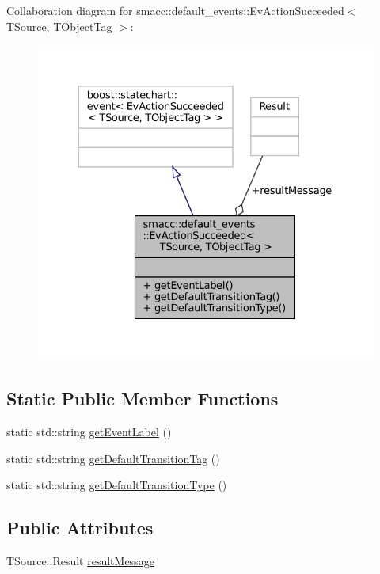 Collaboration diagram for smacc\+:\+:default\+\_\+events\+:\+:Ev\+Action\+Succeeded$<$ T\+Source, T\+Object\+Tag $>$\+:
\nopagebreak
\begin{figure}[H]
\begin{center}
\leavevmode
\includegraphics[width=329pt]{structsmacc_1_1default__events_1_1EvActionSucceeded__coll__graph}
\end{center}
\end{figure}
\subsection*{Static Public Member Functions}
\begin{DoxyCompactItemize}
\item 
static std\+::string \hyperlink{structsmacc_1_1default__events_1_1EvActionSucceeded_a8d002ec0ef39a71d54469fe274ac8c2a}{get\+Event\+Label} ()
\item 
static std\+::string \hyperlink{structsmacc_1_1default__events_1_1EvActionSucceeded_aceba175d35d94315204cb075ad5d103e}{get\+Default\+Transition\+Tag} ()
\item 
static std\+::string \hyperlink{structsmacc_1_1default__events_1_1EvActionSucceeded_a2314ed322e122576381e35986249c68f}{get\+Default\+Transition\+Type} ()
\end{DoxyCompactItemize}
\subsection*{Public Attributes}
\begin{DoxyCompactItemize}
\item 
T\+Source\+::\+Result \hyperlink{structsmacc_1_1default__events_1_1EvActionSucceeded_a5178997ebcf9a7a738e0bda57bd658d1}{result\+Message}
\end{DoxyCompactItemize}


